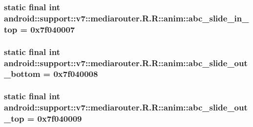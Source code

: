 \hypertarget{classandroid_1_1support_1_1v7_1_1mediarouter_1_1_r_1_1anim_a8e5b5b863e253ac170c351bd6d04b1f}{
\subsubsection[{abc\_\-slide\_\-in\_\-top}]{\setlength{\rightskip}{0pt plus 5cm}static final int android::support::v7::mediarouter.R.R::anim::abc\_\-slide\_\-in\_\-top = 0x7f040007}}
\label{classandroid_1_1support_1_1v7_1_1mediarouter_1_1_r_1_1anim_a8e5b5b863e253ac170c351bd6d04b1f}


\hypertarget{classandroid_1_1support_1_1v7_1_1mediarouter_1_1_r_1_1anim_9919125586034892adc6c05403435660}{
\subsubsection[{abc\_\-slide\_\-out\_\-bottom}]{\setlength{\rightskip}{0pt plus 5cm}static final int android::support::v7::mediarouter.R.R::anim::abc\_\-slide\_\-out\_\-bottom = 0x7f040008}}
\label{classandroid_1_1support_1_1v7_1_1mediarouter_1_1_r_1_1anim_9919125586034892adc6c05403435660}


\hypertarget{classandroid_1_1support_1_1v7_1_1mediarouter_1_1_r_1_1anim_6ac5ec9dbbed4db8d0f618fdde486b4c}{
\subsubsection[{abc\_\-slide\_\-out\_\-top}]{\setlength{\rightskip}{0pt plus 5cm}static final int android::support::v7::mediarouter.R.R::anim::abc\_\-slide\_\-out\_\-top = 0x7f040009}}
\label{classandroid_1_1support_1_1v7_1_1mediarouter_1_1_r_1_1anim_6ac5ec9dbbed4db8d0f618fdde486b4c}


